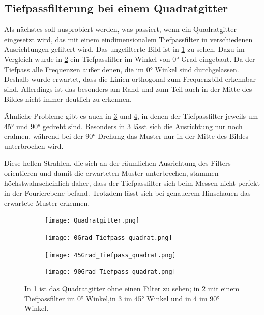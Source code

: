 \newpage

\subsection{Tiefpassfilterung bei einem Quadratgitter}
Als nächstes soll ausprobiert werden, was passiert, wenn ein Quadratgitter eingesetzt wird, das mit einem eindimensionalem Tiefpassfilter in verschiedenen Ausrichtungen gefiltert wird. Das ungefilterte Bild ist in \cref{fig:Gitter} zu sehen. Dazu im Vergleich wurde in \cref{fig:0Gitter} ein Tiefpassfilter im Winkel von 0° Grad eingebaut. Da der Tiefpass alle Frequenzen außer denen, die im 0° Winkel sind durchgelassen. Deshalb wurde erwartet, dass die Linien orthogonal zum Frequenzbild erkennbar sind. Allerdings ist das besonders am Rand und zum Teil auch in der Mitte des Bildes nicht immer deutlich zu erkennen. 

Ähnliche Probleme gibt es auch in \cref{fig:45Gitter} und \cref{fig:90Gitter}, in denen der Tiefpassfilter jeweils um 45° und 90° gedreht sind. Besonders in \cref{fig:45Gitter} lässt sich die Ausrichtung nur noch erahnen, während bei der 90° Drehung das Muster nur in der Mitte des Bildes unterbrochen wird.

Diese hellen Strahlen, die sich an der räumlichen Ausrichtung des Filters orientieren und damit die erwarteten Muster unterbrechen, stammen höchstwahrscheinlich daher, dass der Tiefpassfilter sich beim Messen nicht perfekt in der Fourierebene befand. Trotzdem lässt sich bei genauerem Hinschauen das erwartete Muster erkennen.





\begin{figure}[ht]
	\begin{subfigure}[c]{0.5\textwidth}
		
		\texttt{[image: Quadratgitter.png]}
		\caption{}
		\label{fig:Gitter}
		
	\end{subfigure}
	\begin{subfigure}[c]{0.5\textwidth}
		\texttt{[image: 0Grad\_Tiefpass\_quadrat.png]}
		\caption{}
		\label{fig:0Gitter}
	\end{subfigure}


	\begin{subfigure}[c]{0.5\textwidth}
		
		\texttt{[image: 45Grad\_Tiefpass\_quadrat.png]}
		\caption{}
		\label{fig:45Gitter}
		
	\end{subfigure}
	\begin{subfigure}[c]{0.5\textwidth}
		\texttt{[image: 90Grad\_Tiefpass\_quadrat.png]}
		\caption{}
		\label{fig:90Gitter}
	\end{subfigure}
	\caption{In \cref{fig:Gitter} ist das Quadratgitter ohne einen Filter zu sehen; in \cref{fig:0Gitter} mit einem Tiefpassfilter im 0° Winkel,in \cref{fig:45Gitter} im 45° Winkel und in \cref{fig:90Gitter} im 90° Winkel.}
	\label{blabla}
\end{figure}  



